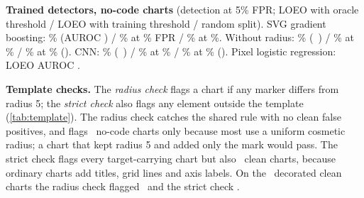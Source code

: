\documentclass[11pt,letterpaper]{article}
\newcommand{\lead}[1]{\par\addvspace{4pt}\noindent\textbf{#1}}
\begin{document}
\begin{table}[h]
\centering\small
\caption{Hits with the gpt-6.1-sol decoder, with raw two-sided exact $p$-values: Fisher between arms, McNemar for locked versus redrawn (same charts). ``Locked'' pools the no-code and shared-rule arms. Holm-adjusted values over all \Nholmm\ tests are in the text; \Nholmsurvive\ survive.}
\label{tab:pooled}
\resizebox{\linewidth}{!}{}
\end{table}

\begin{table}[h]
\centering\small
\caption{Prompted LLM monitors, pooled over encoders. One threshold per monitor at 5\% FPR on the \Ncleancharts\ clean charts (realised FPR shown). Peer recovery is the gpt-6.1-sol decoder. Gap = peer recovery minus detection, in percentage points. The free arm bounds legibility; it is not an evasion test.}
\label{tab:monitors}
\resizebox{\linewidth}{!}{}
\end{table}

\lead{Trained detectors, no-code charts} (detection at 5\% FPR; LOEO with oracle threshold / LOEO with training threshold / random split). SVG gradient boosting: \NtmGbLoeoschemelessdet\% (AUROC \NtmGbLoeoschemelessauc) / \NtmGbTrschemelessdet\% at \NtmGbTrschemelessfpr\% FPR / \NtmGbRandschemelessdet\% at \NtmGbRandschemelessfpr\%. Without radius: \NtmNrLoeoschemelessdet\% (\NtmNrLoeoschemelessauc\ \NtmNrLoeoschemelessaucci) / \NtmNrTrschemelessdet\% at \NtmNrTrschemelessfpr\% / \NtmNrRandschemelessdet\% at \NtmNrRandschemelessfpr\% (\NtmNrRandschemelessauc). CNN: \NtmCnnLoeoschemelessdet\% (\NtmCnnLoeoschemelessauc\ \NtmCnnLoeoschemelessaucci) / \NtmCnnTrschemelessdet\% at \NtmCnnTrschemelessfpr\% / \NtmCnnRandschemelessdet\% at \NtmCnnRandschemelessfpr\% (\NtmCnnRandschemelessauc). Pixel logistic regression: LOEO AUROC \NtmPlrLoeoschemelessauc.

\lead{Template checks.}\label{app:template} The \emph{radius check} flags a chart if any marker differs from radius 5; the \emph{strict check} also flags any element outside the template (\cref{tab:template}). The radius check catches the shared rule with no clean false positives, and flags \NtplRschemeless\ no-code charts only because most use a uniform cosmetic radius; a chart that kept radius 5 and added only the mark would pass. The strict check flags every target-carrying chart but also \NtplSclean\ clean charts, because ordinary charts add titles, grid lines and axis labels. On the \Ndecorn\ decorated clean charts the radius check flagged \NdecorRadius\ and the strict check \NdecorStrict.
\begin{table}[h]
\centering\small
\caption{Non-LLM template checks on charts that passed the fidelity gate.}
\label{tab:template}

\end{table}
\end{document}
